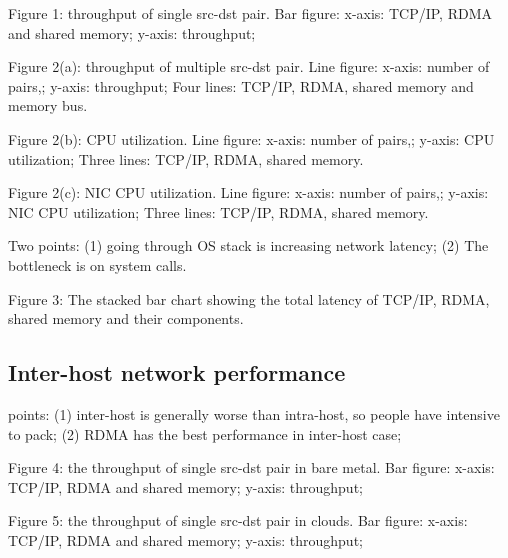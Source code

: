 Figure 1: throughput of single src-dst pair. Bar figure: x-axis: TCP/IP, RDMA and shared memory; y-axis: throughput;

Figure 2(a): throughput of multiple src-dst pair. Line figure: x-axis: number of pairs,; y-axis: throughput; Four lines: TCP/IP, RDMA, shared memory and memory bus.

Figure 2(b): CPU utilization. Line figure: x-axis: number of pairs,; y-axis: CPU utilization; Three lines: TCP/IP, RDMA, shared memory.

Figure 2(c): NIC CPU utilization. Line figure: x-axis: number of pairs,; y-axis: NIC CPU utilization; Three lines: TCP/IP, RDMA, shared memory.


Two points: (1) going through OS stack is increasing network latency; (2) The bottleneck is on system calls.

Figure 3: The stacked bar chart showing the total latency of TCP/IP, RDMA, shared memory and their components.


\subsection{Inter-host network performance}

points: (1) inter-host is generally worse than intra-host, so people have intensive to pack; (2) RDMA has the best performance in inter-host case;

Figure 4: the throughput of single src-dst pair in bare metal. Bar figure: x-axis: TCP/IP, RDMA and shared memory; y-axis: throughput;

Figure 5: the throughput of single src-dst pair in clouds. Bar figure: x-axis: TCP/IP, RDMA and shared memory; y-axis: throughput;
